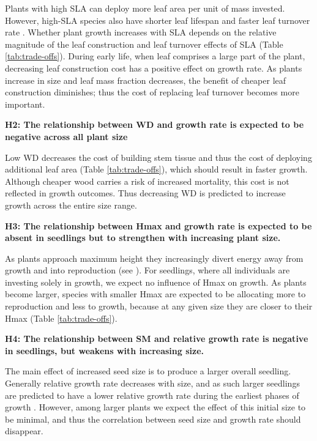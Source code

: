 \documentclass[a4paper]{article}\usepackage[]{graphicx}\usepackage[]{color}
\begin{document}
Plants with high SLA can deploy more leaf area per unit of mass invested. However, high-SLA species also have shorter leaf lifespan and faster leaf turnover rate \citep{Wright:2004jb}. Whether plant growth increases with SLA depends on the relative magnitude of the leaf construction and leaf turnover effects of SLA (Table \ref{tab:trade-offs}). During early life, when leaf comprises a large part of the plant, decreasing leaf construction cost has a positive effect on growth rate. As plants increase in size and leaf mass fraction decreases, the benefit of cheaper leaf construction diminishes; thus the cost of replacing leaf turnover becomes more important.

\textbf{H2: The relationship between WD and growth rate is expected to be negative across all plant size}

Low WD decreases the cost of building stem tissue and thus the cost of deploying additional leaf area (Table \ref{tab:trade-offs}), which should result in faster growth. Although cheaper wood carries a risk of increased mortality, this cost is not reflected in growth outcomes. Thus decreasing WD is predicted to increase growth across the entire size range.

\textbf{H3: The relationship between Hmax and growth rate is expected to be absent in seedlings but to strengthen with increasing plant size.}

As plants approach maximum height they increasingly divert energy away from growth and into reproduction (see \citealt{Thomas:1996do,Thomas-2011, Wenk:2014jz}). For seedlings, where all individuals are investing solely in growth, we expect no influence of Hmax on growth. As plants become larger, species with smaller Hmax are expected to be allocating more to reproduction and less to growth, because at any given size they are closer to their Hmax (Table \ref{tab:trade-offs}).

\textbf{H4: The relationship between SM and relative growth rate is negative in seedlings, but weakens with increasing size.}

The main effect of increased seed size is to produce a larger overall seedling. Generally relative growth rate decreases with size, and as such larger seedlings are predicted to have a lower relative growth rate during the earliest phases of growth \citep{Turnbull:2012ew}. However, among larger plants we expect the effect of this initial size to be minimal, and thus the correlation between seed size and growth rate should disappear.
\end{document}
